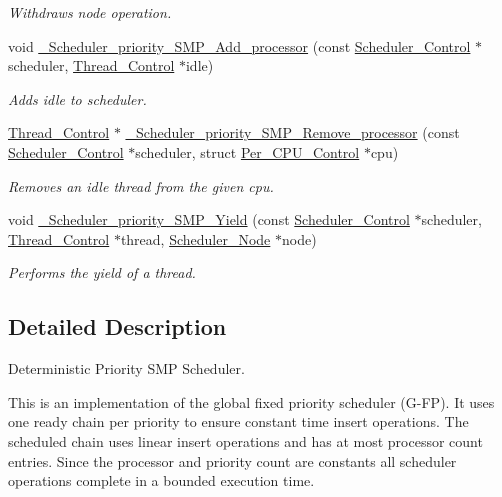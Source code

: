 \begin{DoxyCompactItemize}
\begin{DoxyCompactList}\small\item\em Withdraws node operation. \end{DoxyCompactList}\item 
void \mbox{\hyperlink{group__RTEMSScoreSchedulerPrioritySMP_ga38ce428d9a6c1f4e959a96bed3db0b07}{\+\_\+\+Scheduler\+\_\+priority\+\_\+\+S\+M\+P\+\_\+\+Add\+\_\+processor}} (const \mbox{\hyperlink{struct__Scheduler__Control}{Scheduler\+\_\+\+Control}} $\ast$scheduler, \mbox{\hyperlink{struct__Thread__Control}{Thread\+\_\+\+Control}} $\ast$idle)
\begin{DoxyCompactList}\small\item\em Adds {\itshape idle} to {\itshape scheduler}. \end{DoxyCompactList}\item 
\mbox{\hyperlink{struct__Thread__Control}{Thread\+\_\+\+Control}} $\ast$ \mbox{\hyperlink{group__RTEMSScoreSchedulerPrioritySMP_ga814c22a818cb63420a076ba2ceb3dff5}{\+\_\+\+Scheduler\+\_\+priority\+\_\+\+S\+M\+P\+\_\+\+Remove\+\_\+processor}} (const \mbox{\hyperlink{struct__Scheduler__Control}{Scheduler\+\_\+\+Control}} $\ast$scheduler, struct \mbox{\hyperlink{structPer__CPU__Control}{Per\+\_\+\+C\+P\+U\+\_\+\+Control}} $\ast$cpu)
\begin{DoxyCompactList}\small\item\em Removes an idle thread from the given cpu. \end{DoxyCompactList}\item 
void \mbox{\hyperlink{group__RTEMSScoreSchedulerPrioritySMP_ga5dfea1fa8dd2e6d92683875daa266b5a}{\+\_\+\+Scheduler\+\_\+priority\+\_\+\+S\+M\+P\+\_\+\+Yield}} (const \mbox{\hyperlink{struct__Scheduler__Control}{Scheduler\+\_\+\+Control}} $\ast$scheduler, \mbox{\hyperlink{struct__Thread__Control}{Thread\+\_\+\+Control}} $\ast$thread, \mbox{\hyperlink{structScheduler__Node}{Scheduler\+\_\+\+Node}} $\ast$node)
\begin{DoxyCompactList}\small\item\em Performs the yield of a thread. \end{DoxyCompactList}\end{DoxyCompactItemize}


\subsection{Detailed Description}
Deterministic Priority S\+MP Scheduler. 

This is an implementation of the global fixed priority scheduler (G-\/\+FP). It uses one ready chain per priority to ensure constant time insert operations. The scheduled chain uses linear insert operations and has at most processor count entries. Since the processor and priority count are constants all scheduler operations complete in a bounded execution time.

